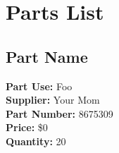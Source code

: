 
\section{Parts List}
\label{sec:parts}

\subsection{Part Name}
\label{part:name_of_part}
\textbf{Part Use:} Foo \\ 
\textbf{Supplier:} Your Mom \\
\textbf{Part Number:} 8675309 \\
\textbf{Price:} \$0   \\ 
\textbf{Quantity:} 20  \\

